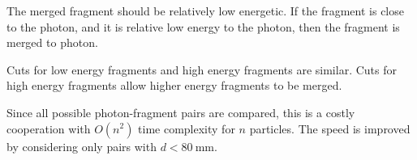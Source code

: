 The merged fragment should be relatively low energetic.  If the fragment is close to the photon, and it is relative low energy to the photon, then the fragment is merged to photon.





Cuts for low energy fragments and high energy fragments are similar. Cuts for high energy fragments allow higher energy fragments to be merged.


Since all possible photon-fragment pairs are compared, this is a costly cooperation with $O(n^2)$ time complexity for $n$ particles. The speed is improved by considering only pairs with $d<80\ \text{mm}$.

